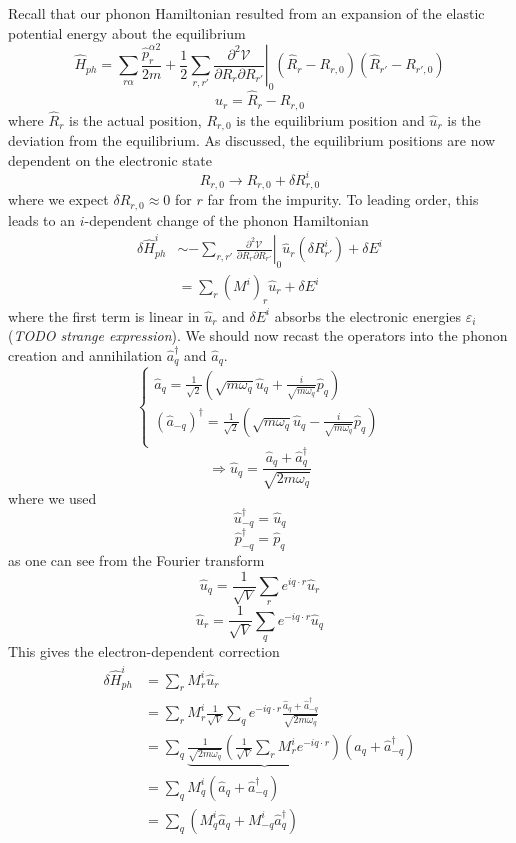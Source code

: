 Recall that our phonon Hamiltonian resulted from an expansion of the elastic potential energy about the equilibrium
\[ \hat{H}_{ph}=\sum_{r\alpha}{\frac{\hat{p}_{r}^{\alpha 2}}{2m}}+\frac{1}{2}\sum_{r,r'}{\left. \frac{\partial ^2\mathcal{V}}{\partial R_r\partial R_{r'}} \right|_0\left( \hat{R}_r-R_{r,0} \right) \left( \hat{R}_{r'}-R_{r',0} \right)}\]
\[ \hat{u}_r=\hat{R}_r-R_{r,0}\]
where $\hat{R}_r$ is the actual position, $R_{r,0}$ is the equilibrium position and $\hat{u}_r$ is the deviation from the equilibrium. As discussed, the equilibrium positions are now dependent on the electronic state
\[ R_{r,0}\rightarrow R_{r,0}+\delta R_{r,0}^{i}\]
where we expect $\delta R_{r,0}\approx 0$ for $r$ far from the impurity. To leading order, this leads to an $i$-dependent change of the phonon Hamiltonian
\begin{align*}
    \delta \hat{H}_{ph}^{i}&\sim -\sum_{r,r'}{\left. \frac{\partial ^2\mathcal{V}}{\partial R_r\partial R_{r'}} \right|_0\hat{u}_r\left( \delta R_{r'}^{i} \right)}+\delta E^i\\
    &=\sum_r{\left( M^i \right) _r\hat{u}_r}+\delta E^i
\end{align*}
where the first term is linear in $\hat{u}_r$ and $\delta E^i$ absorbs the electronic energies $\varepsilon_i$ (\emph{TODO strange expression}). We should now recast the operators into the phonon creation and annihilation $\hat{a}_q^\dagger$ and $\hat{a}_q$.
\[ \begin{cases}
	\hat{a}_q=\frac{1}{\sqrt{2}}\left( \sqrt{m\omega _q}\hat{u}_q+\frac{i}{\sqrt{m\omega _q}}\hat{p}_q \right)\\
	(\hat{a}_{-q})^{\dagger}=\frac{1}{\sqrt{2}}\left( \sqrt{m\omega _q}\hat{u}_q-\frac{i}{\sqrt{m\omega _q}}\hat{p}_q \right)\\
\end{cases}\]
\[ \Rightarrow \hat{u}_q=\frac{\hat{a}_q+\hat{a}_{q}^{\dagger}}{\sqrt{2m\omega _q}} \]
where we used
\[ \hat{u}_{-q}^{\dagger}=\hat{u}_q\]
\[ \hat{p}_{-q}^{\dagger}=\hat{p}_q\]
as one can see from the Fourier transform
\[ \hat{u}_q=\frac{1}{\sqrt{V}}\sum_r{e^{iq\cdot r}\hat{u}_r}\]
\[ \hat{u}_r=\frac{1}{\sqrt{V}}\sum_q{e^{-iq\cdot r}\hat{u}_q}\]
This gives the electron-dependent correction
\begin{align*}
    \delta \hat{H}_{ph}^{i}&=\sum_r{M_{r}^{i}\hat{u}_r}\\
    &=\sum_r{M_{r}^{i}\frac{1}{\sqrt{V}}\sum_q{e^{-iq\cdot r}\frac{\hat{a}_q+\hat{a}_{-q}^{\dagger}}{\sqrt{2m\omega _q}}}}\\
    &=\sum_q{\underbrace{\frac{1}{\sqrt{2m\omega _q}}\left( \frac{1}{\sqrt{V}}\sum_r{M_{r}^{i}e^{-iq\cdot r}} \right) }\left( \hat{a}_q+\hat{a}_{-q}^{\dagger} \right)}\\
    &=\sum_q{M_{q}^{i}\left( \hat{a}_q+\hat{a}_{-q}^{\dagger} \right)}\\
    &=\sum_q{\left( M_{q}^{i}\hat{a}_q+M_{-q}^{i}\hat{a}_{q}^{\dagger} \right)}
\end{align*}
